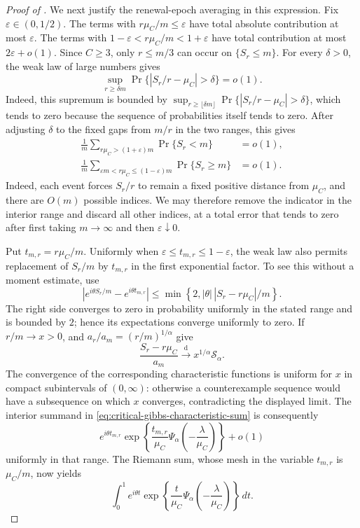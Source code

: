 \begin{proof}[Proof of ]
We next justify the renewal-epoch averaging in this expression.  Fix
\(\varepsilon\in(0,1/2)\).  The terms with
\(r\mu_C/m\le\varepsilon\) have total absolute contribution at most
\(\varepsilon\).  The terms with
\(1-\varepsilon<r\mu_C/m<1+\varepsilon\) have total contribution at most
\(2\varepsilon+o(1)\).  Since \(C\ge3\), only \(r\le m/3\) can occur on
\(\{S_r\le m\}\).  For every \(\delta>0\), the weak law of large
numbers gives
\[
 \sup_{r\ge\delta m}
 \Pr\{|S_r/r-\mu_C|>\delta\}=o(1).
\]
Indeed, this supremum is bounded by
\(\sup_{r\ge\lfloor\delta m\rfloor}
\Pr\{|S_r/r-\mu_C|>\delta\}\), which tends to zero because the
sequence of probabilities itself tends to zero.  After adjusting
\(\delta\) to the fixed gaps from \(m/r\) in the two ranges, this gives
\begin{align*}
 \frac1m\sum_{r\mu_C>(1+\varepsilon)m}\Pr\{S_r<m\}&=o(1),\\
 \frac1m\sum_{\varepsilon m<r\mu_C\le(1-\varepsilon)m}
       \Pr\{S_r\ge m\}&=o(1).
\end{align*}
Indeed, each event forces \(S_r/r\) to remain a fixed positive distance
from \(\mu_C\), and there are \(O(m)\) possible indices.  We may therefore
remove the indicator in the interior range and discard all other indices,
at a total error that tends to zero after first taking \(m\to\infty\) and
then \(\varepsilon\downarrow0\).

Put \(t_{m,r}=r\mu_C/m\).  Uniformly when
\(\varepsilon\le t_{m,r}\le1-\varepsilon\), the weak law also permits
replacement of \(S_r/m\) by \(t_{m,r}\) in the first exponential factor.
To see this without a moment estimate, use
\[
 \left|e^{i\theta S_r/m}-e^{i\theta t_{m,r}}\right|
 \le \min\left\{2,|\theta|\,|S_r-r\mu_C|/m\right\}.
\]
The right side converges to zero in probability uniformly in the stated
range and is bounded by \(2\); hence its expectations converge uniformly
to zero.
If \(r/m\to x>0\),
 and
\(a_r/a_m=(r/m)^{1/\alpha}\) give
\[
 \frac{S_r-r\mu_C}{a_m}
 \xrightarrow{\mathrm d}x^{1/\alpha}\mathcal S_\alpha.
\]
The convergence of the corresponding characteristic functions is uniform
for \(x\) in compact subintervals of \((0,\infty)\): otherwise a
counterexample sequence would have a subsequence on which \(x\) converges,
contradicting the displayed limit.  The interior summand in
\eqref{eq:critical-gibbs-characteristic-sum} is consequently
\[
 e^{i\theta t_{m,r}}
 \exp\left\{\frac{t_{m,r}}{\mu_C}
       \Psi_\alpha\left(-\frac{\lambda}{\mu_C}\right)\right\}+o(1)
\]
uniformly in that range.  The Riemann sum, whose mesh in the variable
\(t_{m,r}\) is \(\mu_C/m\), now yields
\begin{equation}
 \int_0^1 e^{i\theta t}
 \exp\left\{\frac{t}{\mu_C}
       \Psi_\alpha\left(-\frac{\lambda}{\mu_C}\right)\right\}\,dt.
 \label{eq:critical-gibbs-limit-characteristic-function}
\end{equation}


\end{proof}
